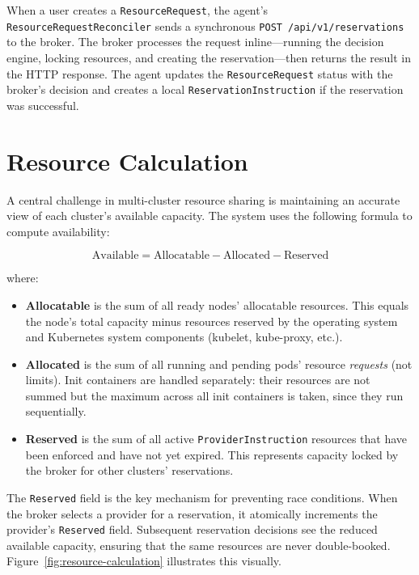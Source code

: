 When a user creates a \texttt{ResourceRequest}, the agent's \texttt{ResourceRequestReconciler} sends a synchronous \texttt{POST /api/v1/reservations} to the broker. The broker processes the request inline---running the decision engine, locking resources, and creating the reservation---then returns the result in the HTTP response. The agent updates the \texttt{ResourceRequest} status with the broker's decision and creates a local \texttt{ReservationInstruction} if the reservation was successful.


\section{Resource Calculation}
\label{sec:resource-calculation}

A central challenge in multi-cluster resource sharing is maintaining an accurate view of each cluster's available capacity. The system uses the following formula to compute availability:

\begin{equation}
\label{eq:available}
\text{Available} = \text{Allocatable} - \text{Allocated} - \text{Reserved}
\end{equation}

\noindent where:

\begin{itemize}
    \item \textbf{Allocatable} is the sum of all ready nodes' allocatable resources. This equals the node's total capacity minus resources reserved by the operating system and Kubernetes system components (kubelet, kube-proxy, etc.).
    \item \textbf{Allocated} is the sum of all running and pending pods' resource \emph{requests} (not limits). Init containers are handled separately: their resources are not summed but the maximum across all init containers is taken, since they run sequentially.
    \item \textbf{Reserved} is the sum of all active \texttt{ProviderInstruction} resources that have been enforced and have not yet expired. This represents capacity locked by the broker for other clusters' reservations.
\end{itemize}

The \texttt{Reserved} field is the key mechanism for preventing race conditions. When the broker selects a provider for a reservation, it atomically increments the provider's \texttt{Reserved} field. Subsequent reservation decisions see the reduced available capacity, ensuring that the same resources are never double-booked. Figure~\ref{fig:resource-calculation} illustrates this visually.

